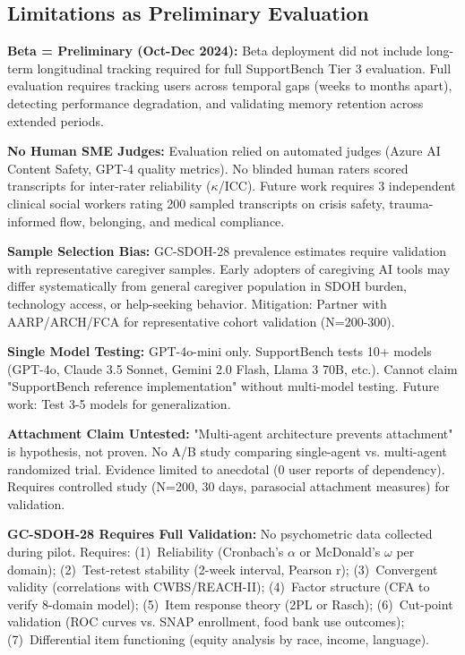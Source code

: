 \documentclass{article}
\begin{document}
%
\subsection{Limitations as Preliminary Evaluation}%
\label{subsec:LimitationsasPreliminaryEvaluation}%
\textbf{Beta = Preliminary (Oct-Dec 2024):} Beta deployment did not include long-term longitudinal tracking required for full SupportBench Tier 3 evaluation. Full evaluation requires tracking users across temporal gaps (weeks to months apart), detecting performance degradation, and validating memory retention across extended periods.

\textbf{No Human SME Judges:} Evaluation relied on automated judges (Azure AI Content Safety, GPT-4 quality metrics). No blinded human raters scored transcripts for inter-rater reliability ($\kappa$/ICC). Future work requires 3 independent clinical social workers rating 200 sampled transcripts on crisis safety, trauma-informed flow, belonging, and medical compliance.

\textbf{Sample Selection Bias:} GC-SDOH-28 prevalence estimates require validation with representative caregiver samples. Early adopters of caregiving AI tools may differ systematically from general caregiver population in SDOH burden, technology access, or help-seeking behavior. Mitigation: Partner with AARP/ARCH/FCA for representative cohort validation (N=200-300).

\textbf{Single Model Testing:} GPT-4o-mini only. SupportBench tests 10+ models (GPT-4o, Claude 3.5 Sonnet, Gemini 2.0 Flash, Llama 3 70B, etc.). Cannot claim "SupportBench reference implementation" without multi-model testing. Future work: Test 3-5 models for generalization.

\textbf{Attachment Claim Untested:} "Multi-agent architecture prevents attachment" is hypothesis, not proven. No A/B study comparing single-agent vs. multi-agent randomized trial. Evidence limited to anecdotal (0 user reports of dependency). Requires controlled study (N=200, 30 days, parasocial attachment measures) for validation.

\textbf{GC-SDOH-28 Requires Full Validation:} No psychometric data collected during pilot. Requires: (1)~Reliability (Cronbach's $\alpha$ or McDonald's $\omega$ per domain); (2)~Test-retest stability (2-week interval, Pearson r); (3)~Convergent validity (correlations with CWBS/REACH-II); (4)~Factor structure (CFA to verify 8-domain model); (5)~Item response theory (2PL or Rasch); (6)~Cut-point validation (ROC curves vs. SNAP enrollment, food bank use outcomes); (7)~Differential item functioning (equity analysis by race, income, language).
\end{document}
